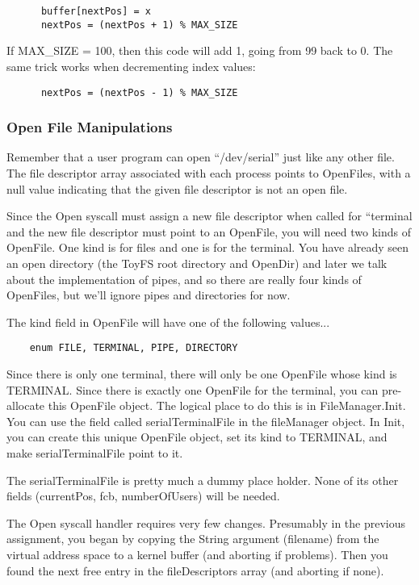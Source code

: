 \documentclass[11pt]{article}
\begin{document}
\begin{verbatim}
      buffer[nextPos] = x
      nextPos = (nextPos + 1) % MAX_SIZE
\end{verbatim}

If MAX\_SIZE = 100, then this code will add 1, going from 99 back to 0.  The same trick works when decrementing index values:

\begin{verbatim}
      nextPos = (nextPos - 1) % MAX_SIZE
\end{verbatim}

\subsubsection{Open File Manipulations}
      
Remember that a user program can open ``/dev/serial''
just like any other file.  The file descriptor array associated with
each process points to OpenFiles, with a null value indicating that
the given file descriptor is not an open file.

Since the Open syscall must assign a new file descriptor when called
for ``terminal and the new file descriptor must point to an OpenFile,
you will need two kinds of OpenFile.  One kind is for files and one is
for the terminal.   You have already seen an open directory (the ToyFS
root directory and OpenDir) and later we talk about the implementation of
pipes, and so there are really four kinds of OpenFiles, but we'll ignore
pipes and directories for now.

The kind field in OpenFile will have one of the following values...

\begin{verbatim}
    enum FILE, TERMINAL, PIPE, DIRECTORY
\end{verbatim}


Since there is only one terminal, there will only be one OpenFile
whose kind is TERMINAL.  Since there is exactly one OpenFile for the
terminal, you can pre-allocate this OpenFile object.  The logical
place to do this is in FileManager.Init.  You can use the field called
serialTerminalFile in the fileManager object.  In Init, you can create
this unique OpenFile object, set its kind to TERMINAL, and make
serialTerminalFile point to it.

The serialTerminalFile is pretty much a dummy place holder.  None of
its other fields (currentPos, fcb, numberOfUsers) will be needed.

The Open syscall handler requires very few changes.  Presumably in the
previous assignment, you began by copying the String argument
(filename) from the virtual address space to a kernel buffer (and
aborting if problems).  Then you found the next free entry in the
fileDescriptors array (and aborting if none).
\end{document}
